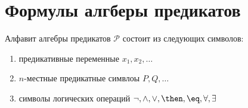 \section{Формулы алгберы предикатов}
\dftion Алфавит алгебры предикатов $\mathscr{P}$ состоит из следующих символов:
\begin{enumerate}
    \item предикативные переменные $x_1, x_2, \dots$
    \item $n$-местные предикатные симвлоы $P, Q, \dots$
    \item символы логических операций $\lnot, \land, \lor, \then, \eq, \forall, \exists$
\end{enumerate}